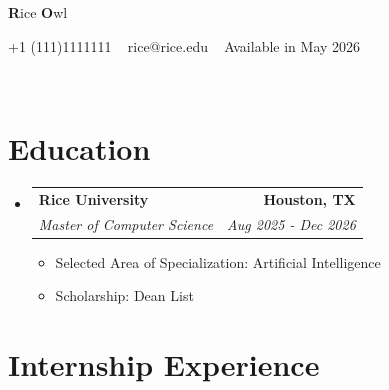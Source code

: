\documentclass[letterpaper,10pt]{article}
\makeatletter
\newcommand{\resumeItem}[1]{
  \item[\small$\bullet$]\small{
    {#1 \vspace{-1.5pt}}
  }
}
\newcommand{\resumeSubheading}[4]{
  \vspace{-2pt}\item
    \begin{tabular*}{1.0\textwidth}[t]{l@{\extracolsep{\fill}}r}
      \textbf{\large#1} & \textbf{\small #2} \\
      \textit{\large#3} & \textit{\small #4} \\
      
    \end{tabular*}\vspace{-7pt}
}
\newcommand{\resumeSubHeadingListStart}{\begin{itemize}[leftmargin=0.0in, label={}]}
\newcommand{\resumeSubHeadingListEnd}{\end{itemize}}
\newcommand{\resumeItemListStart}{\begin{itemize}[leftmargin=0.1in]}
\newcommand{\resumeItemListEnd}{\end{itemize}\vspace{-5pt}}
\makeatother
\begin{document}
\begin{center}
    {\Huge \color{RiceBlue}\textbf{R}ice \textbf{O}wl} \\ \vspace{2pt} 
    
    {\color{RiceBlue}}
    {+1 (111)1111111} ~ 
    {\color{RiceBlue}} 
    {rice@rice.edu} ~
    {\color{RiceBlue}} 
    {Available in May 2026} ~ 

    {\color{RiceBlue}}
    \href{https://www.google.com/}{} ~
    {\color{RiceBlue}} 
    \href{https://www.google.com/}{}  ~
    {\color{RiceBlue}}
    \href{https://www.google.com/}{} ~
    {\color{RiceBlue}}
    \href{https://www.google.com/}{} ~
    
    \vspace{-15pt}
\end{center}

\section{\color{RiceBlue}\textbf{Education}}

\resumeSubHeadingListStart
    \resumeSubheading
      {\selectfont Rice University}{Houston, TX}
      {\selectfont Master of Computer Science}{Aug 2025 - Dec 2026}
      
    \vspace{-5pt}
    
    \resumeItemListStart
            \resumeItem{\normalsize{Selected Area of Specialization: Artificial Intelligence}}
            \resumeItem{\normalsize{Scholarship: Dean List}}
      \resumeItemListEnd  
    
  \resumeSubHeadingListEnd
  \vspace{-5pt}

\section{\color{RiceBlue}\textbf{Internship Experience}}
\end{document}
